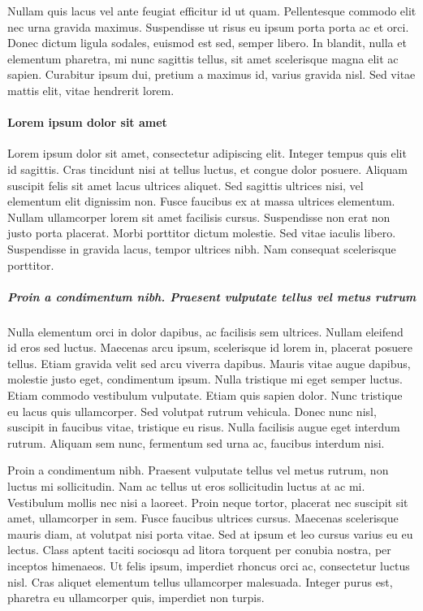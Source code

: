 Nullam quis lacus vel ante feugiat efficitur id ut quam. Pellentesque commodo elit nec urna gravida maximus. Suspendisse ut risus eu ipsum porta porta ac et orci. Donec dictum ligula sodales, euismod est sed, semper libero. In blandit, nulla et elementum pharetra, mi nunc sagittis tellus, sit amet scelerisque magna elit ac sapien. Curabitur ipsum dui, pretium a maximus id, varius gravida nisl. Sed vitae mattis elit, vitae hendrerit lorem. 

\paragraph{Lorem ipsum dolor sit amet}

Lorem ipsum dolor sit amet, consectetur adipiscing elit. Integer tempus quis elit id sagittis. Cras tincidunt nisi at tellus luctus, et congue dolor posuere. Aliquam suscipit felis sit amet lacus ultrices aliquet. Sed sagittis ultrices nisi, vel elementum elit dignissim non. Fusce faucibus ex at massa ultrices elementum. Nullam ullamcorper lorem sit amet facilisis cursus. Suspendisse non erat non justo porta placerat. Morbi porttitor dictum molestie. Sed vitae iaculis libero. Suspendisse in gravida lacus, tempor ultrices nibh. Nam consequat scelerisque porttitor.

\subparagraph{Proin a condimentum nibh. Praesent vulputate tellus vel metus rutrum}

Nulla elementum orci in dolor dapibus, ac facilisis sem ultrices. Nullam eleifend id eros sed luctus. Maecenas arcu ipsum, scelerisque id lorem in, placerat posuere tellus. Etiam gravida velit sed arcu viverra dapibus. Mauris vitae augue dapibus, molestie justo eget, condimentum ipsum. Nulla tristique mi eget semper luctus. Etiam commodo vestibulum vulputate. Etiam quis sapien dolor. Nunc tristique eu lacus quis ullamcorper. Sed volutpat rutrum vehicula. Donec nunc nisl, suscipit in faucibus vitae, tristique eu risus. Nulla facilisis augue eget interdum rutrum. Aliquam sem nunc, fermentum sed urna ac, faucibus interdum nisi.




Proin a condimentum nibh. Praesent vulputate tellus vel metus rutrum, non luctus mi sollicitudin. Nam ac tellus ut eros sollicitudin luctus at ac mi. Vestibulum mollis nec nisi a laoreet. Proin neque tortor, placerat nec suscipit sit amet, ullamcorper in sem. Fusce faucibus ultrices cursus. Maecenas scelerisque mauris diam, at volutpat nisi porta vitae. Sed at ipsum et leo cursus varius eu eu lectus. Class aptent taciti sociosqu ad litora torquent per conubia nostra, per inceptos himenaeos. Ut felis ipsum, imperdiet rhoncus orci ac, consectetur luctus nisl. Cras aliquet elementum tellus ullamcorper malesuada. Integer purus est, pharetra eu ullamcorper quis, imperdiet non turpis.

